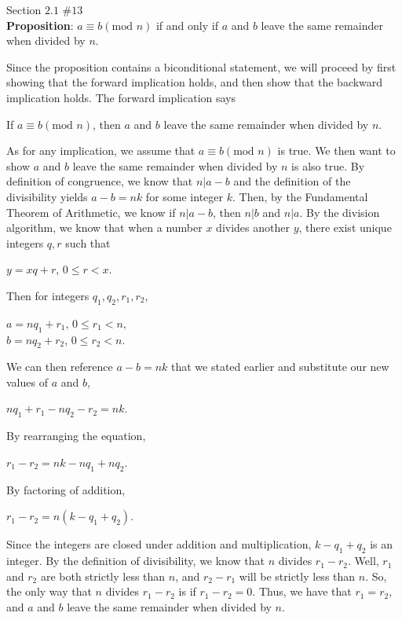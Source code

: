 \documentclass[12pt]{article}
\newenvironment{problem}[2][Problem]{\begin{trivlist}
\item[\hskip \labelsep {\bfseries #1}\hskip \labelsep {\bfseries #2.}]}{\end{trivlist}}
\begin{document}
\begin{problem}{4} Section $2.1$ $\#13$ \\

\noindent
\textbf{Proposition}: $a \equiv b(\text{mod }n)$ if and only if $a$ and $b$ leave the same remainder when divided by $n$.

\vspace{.3cm}

\noindent
Since the proposition contains a biconditional statement, we will proceed by first showing that the forward implication holds, and then show that the backward implication holds. The forward implication says 
\begin{center}
If $a \equiv b(\text{mod }n)$, then $a$ and $b$ leave the same remainder when divided by $n$.
\end{center}
\noindent
As for any implication, we assume that $a \equiv b(\text{mod }n)$ is true. We then want to show $a$ and $b$ leave the same remainder when divided by $n$ is also true. By definition of congruence, we know that $n|a-b$ and the definition of the divisibility yields $a-b=nk$ for some integer $k$. 
Then, by the Fundamental Theorem of Arithmetic, we know if $n|a-b$, then $n|b$ and $n|a$. By the division algorithm, we know that when a number $x$ divides another $y$, there exist unique integers $q,r$ such that 
\begin{center}
$y=xq+r$, $0 \leq r < x$.
\end{center}
\noindent
Then for integers $q_1, q_2, r_1, r_2$,
\begin{center}
$a=nq_1+r_1$, $0 \leq r_1 < n$, \\
$b=nq_2+r_2$, $0 \leq r_2 < n$.
\end{center}
\noindent
We can then reference $a-b=nk$ that we stated earlier and substitute our new values of $a$ and $b$,
\begin{center}
$nq_1+r_1-nq_2-r_2=nk$.
\end{center}
\noindent
By rearranging the equation,
\begin{center}
$r_1-r_2=nk-nq_1+nq_2$.
\end{center}
\noindent
By factoring of addition,
 \begin{center}
$r_1-r_2=n(k-q_1+q_2)$.
\end{center}
\noindent
Since the integers are closed under addition and multiplication, $k-q_1+q_2$ is an integer. By the definition of divisibility, we know that $n$ divides $r_1-r_2$. Well, $r_1$ and $r_2$ are both strictly less than $n$, and $r_2-r_1$ will be strictly less than $n$. So, the only way that $n$ divides $r_1-r_2$ is if $r_1-r_2=0$. Thus, we have that $r_1=r_2$, and $a$ and $b$ leave the same remainder when divided by $n$. 


\end{problem}
\end{document}
